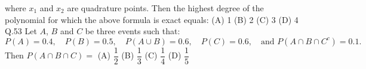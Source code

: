 \documentclass{article}
\begin{document}
																																																																																																				          where $x_1$ and $x_2$ are quadrature points. Then the highest degree of the polynomial for which the above formula is exact equals:
																																																																																																					  \vspace{1em}   \newline
																																																																																																					  (A) 1 \hspace{2cm}(B) 2 \hspace{2cm} (C) 3 \hspace{2cm} (D) 4   
																																																																																																					  \vspace{1em}
																																																																																																					  \newline
																																																																																																					  Q.53 \quad Let $A$, $B$ and $C$ be three events such that:
																																																																																																					      \[
																																																																																																					          P(A) = 0.4,\quad P(B) = 0.5,\quad P(A \cup B) = 0.6,\quad P(C) = 0.6,\quad \text{and } P(A \cap B \cap C^c) = 0.1.
																																																																																																						      \]
																																																																																																						          Then $P(A \cap B \cap C) =$
																																																																																																							      \vspace{1em}  \newline
																																																																																																							      (A) $\dfrac{1}{2}$ \hspace{2cm}(B) $\dfrac{1}{3}$ \hspace{2cm} (C) $\dfrac{1}{4}$ \hspace{2cm} (D) $\dfrac{1}{5}$  
																																																																																																							      \vspace{2em}
																																																																																																							      \newline
\end{document}
